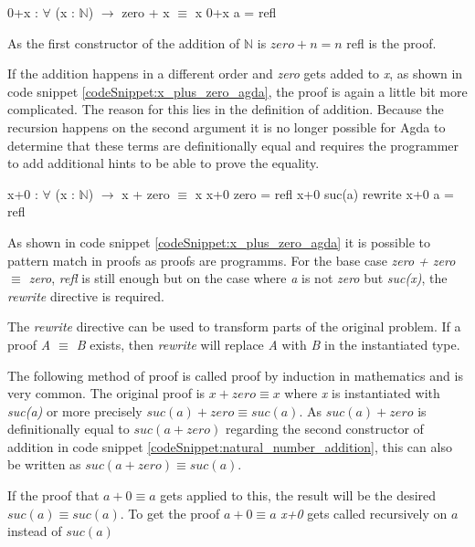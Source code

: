 \begin{codesnippet}[mathescape=true, caption={Proof of addition to zero in Agda}, label={codeSnippet:zero_plus_x_agda}]
0+x : $\forall$ (x : $\mathbb{N}$) $\rightarrow$ zero + x $\equiv$ x
0+x a = refl
\end{codesnippet}

As the first constructor of the addition of $\mathbb{N}$ is $zero + n = n$ refl is the proof.

If the addition happens in a different order and \emph{zero} gets added to \emph{x}, as shown in code snippet \ref{codeSnippet:x_plus_zero_agda}, the proof is again a little bit more complicated. 
The reason for this lies in the definition of addition.
Because the recursion happens on the second argument it is no longer possible for Agda to determine that these terms are definitionally equal and requires the programmer to add additional hints to be able to prove the equality.

\begin{codesnippet}[mathescape=true, caption={Proof of addition of zero in Agda}, label={codeSnippet:x_plus_zero_agda}]
x+0 : $\forall$ (x : $\mathbb{N}$) $\rightarrow$ x + zero $\equiv$ x
x+0 zero = refl
x+0 suc(a) rewrite x+0 a = refl
\end{codesnippet}

As shown in code snippet \ref{codeSnippet:x_plus_zero_agda} it is possible to pattern match in proofs as proofs are programms.
For the base case \emph{zero + zero $\equiv$ zero}, \emph{refl} is still enough but on the case where \emph{a} is not \emph{zero} but \emph{suc(x)}, the \emph{rewrite} directive is required.

The \emph{rewrite} directive can be used to transform parts of the original problem. If a proof \emph{A $\equiv$ B} exists, then \emph{rewrite} will replace \emph{A} with \emph{B} in the instantiated type.

The following method of proof is called proof by induction in mathematics and is very common.
The original proof is $x + zero \equiv x$ where \emph{x} is instantiated with \emph{suc(a)} or more precisely $suc(a) + zero \equiv suc(a)$.
As $suc(a) + zero$ is definitionally equal to $suc(a + zero)$ regarding the second constructor of addition in code snippet \ref{codeSnippet:natural_number_addition}, this can also be written as $suc(a + zero) \equiv suc(a)$.

If the proof that $a + 0 \equiv a$ gets applied to this, the result will be the desired $suc(a) \equiv suc(a)$. 
To get the proof $a + 0 \equiv a$ \emph{x+0} gets called recursively on $a$ instead of $suc(a)$

